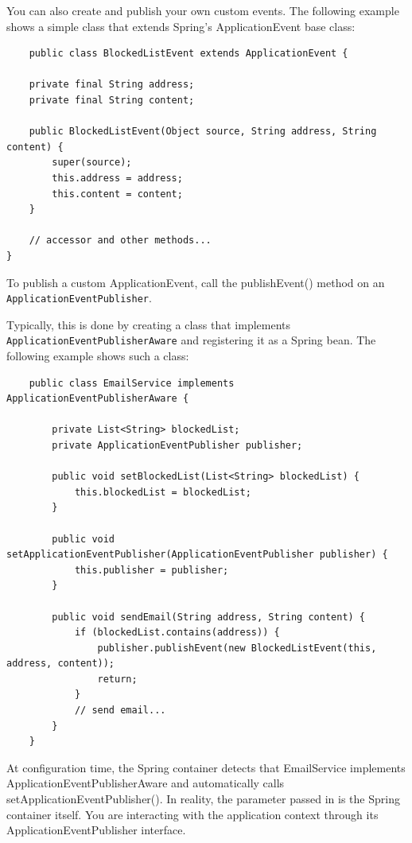 \documentclass{scrartcl}
\begin{document}
You can also create and publish your own custom events. The following example shows a simple class that extends Spring’s ApplicationEvent base class:

\begin{lstlisting}
    public class BlockedListEvent extends ApplicationEvent {

    private final String address;
    private final String content;

    public BlockedListEvent(Object source, String address, String content) {
        super(source);
        this.address = address;
        this.content = content;
    }

    // accessor and other methods...
}

\end{lstlisting}

To publish a custom ApplicationEvent, call the publishEvent() method on an \lstinline|ApplicationEventPublisher|.

Typically, this is done by creating a class that implements \lstinline|ApplicationEventPublisherAware| and registering it as a Spring bean. The following example shows such a class:

\begin{lstlisting}
    public class EmailService implements ApplicationEventPublisherAware {

        private List<String> blockedList;
        private ApplicationEventPublisher publisher;

        public void setBlockedList(List<String> blockedList) {
            this.blockedList = blockedList;
        }

        public void setApplicationEventPublisher(ApplicationEventPublisher publisher) {
            this.publisher = publisher;
        }

        public void sendEmail(String address, String content) {
            if (blockedList.contains(address)) {
                publisher.publishEvent(new BlockedListEvent(this, address, content));
                return;
            }
            // send email...
        }
    }
\end{lstlisting}

At configuration time, the Spring container detects that EmailService implements ApplicationEventPublisherAware and automatically calls setApplicationEventPublisher(). In reality, the parameter passed in is the Spring container itself. You are interacting with the application context through its ApplicationEventPublisher interface.
\end{document}
